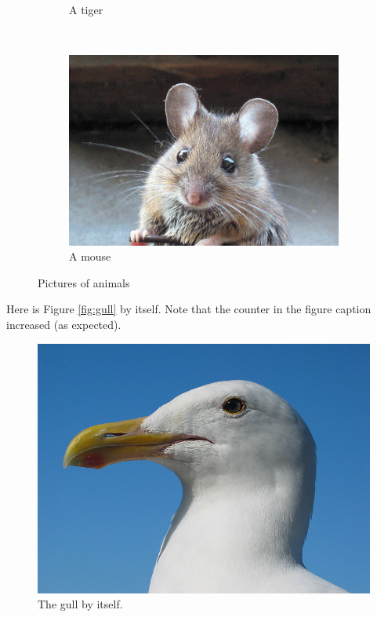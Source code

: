 \documentclass[10pt]{article}
\begin{document}
\begin{figure}
\begin{subfigure}[b]{0.3\textwidth}
    \caption{A tiger}
    \label{fig:tiger}
  \end{subfigure}
  ~ %
  \begin{subfigure}[b]{0.3\textwidth}
    \includegraphics[width=\textwidth]{mouse}
    \caption{A mouse}
    \label{fig:mouse}
  \end{subfigure}
  \caption{Pictures of animals}\label{fig:animals}
\end{figure}

Here is Figure \ref{fig:gull} by itself. Note that the counter in the
figure caption increased (as expected).
\begin{figure}
  \centering
  \includegraphics[width=\textwidth]{gull}
  \caption{The gull by itself.}
  \label{fig:gull_alone}
\end{figure}
\end{document}
